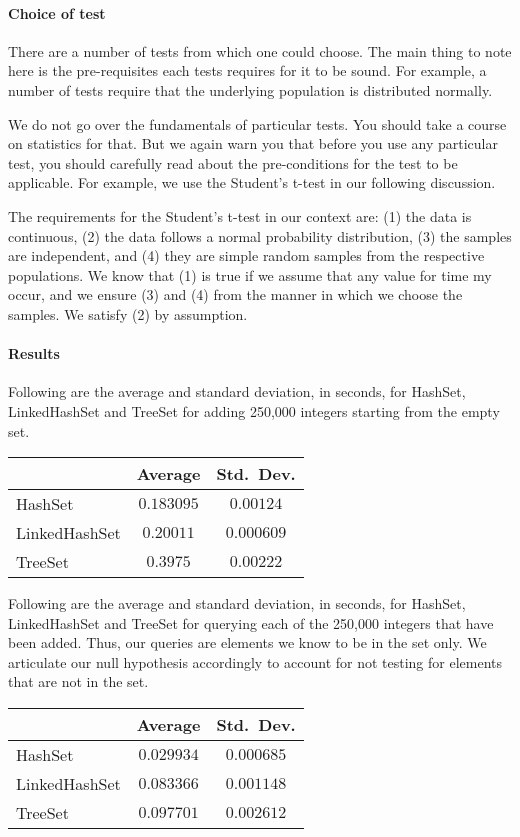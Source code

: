 \paragraph{Choice of test} There are a number of tests from
which one could choose. The main thing to note here is the
pre-requisites each tests requires for it to be sound.
For example, a number of tests require that the underlying
population is distributed normally.

We do not go over the fundamentals of particular tests. You
should take a course on statistics for that. But we again
warn you that before you use any particular test, you should
carefully read about the pre-conditions for the test to be
applicable. For example, we use the Student's t-test in
our following discussion. 

The requirements for the Student's t-test in our context
are: (1) the data is continuous, (2) the data follows a normal
probability distribution, (3) the samples are independent, and
(4) they are simple random samples from the respective populations.
We know that (1) is true if we assume that any value for time my
occur, and we ensure (3) and (4) from the
manner in which we choose the samples. We satisfy (2) by
assumption.

\paragraph{Results} Following are the average and standard
deviation, in seconds, for HashSet, LinkedHashSet and TreeSet for
adding 250,000 integers starting from the empty set.
\begin{center}
    \begin{tabular}{|l|c|c|}
	\cline{2-3}
	\multicolumn{1}{c|}{} & Average & Std.~Dev.\\ \hline
	HashSet & $0.183095$ & $0.00124$ \\ \hline
	LinkedHashSet & $0.20011$ & $0.000609$ \\ \hline
	TreeSet & $0.3975$ & $0.00222$ \\ \hline
    \end{tabular}
\end{center}

Following are the average and standard
deviation, in seconds, for HashSet, LinkedHashSet and TreeSet for
querying each of the 250,000 integers that have been added.
Thus, our queries are elements we know to be in the set only.
We articulate our null hypothesis accordingly to account for
not testing for elements that are not in the set.
\begin{center}
    \begin{tabular}{|l|c|c|}
	\cline{2-3}
	\multicolumn{1}{c|}{} & Average & Std.~Dev.\\ \hline
	HashSet & $0.029934$ & $0.000685$ \\ \hline
	LinkedHashSet & $0.083366$ & $0.001148$ \\ \hline
	TreeSet & $0.097701$ & $0.002612$ \\ \hline
    \end{tabular}
\end{center}

